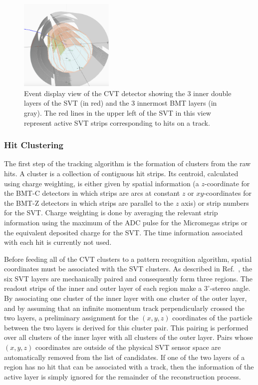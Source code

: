 \begin{figure}
\centering
\includegraphics[width=0.4\textwidth]{pics/cvt.png}
\caption{Event display view of the CVT detector showing the 3 inner double layers of the SVT (in red) and the 3
  innermost BMT layers (in gray). The red lines in the upper left of the SVT in this view represent active SVT strips
  corresponding to hits on a track.}
\label{fig:cvt}
\end{figure}

\subsubsection{Hit Clustering}

The first step of the tracking algorithm is the formation of clusters from the raw hits. A cluster is a collection of
contiguous hit strips. Its centroid, calculated using charge weighting, is either given by spatial information (a
$z$-coordinate for the BMT-C detectors in which strips are arcs at constant $z$ or $xy$-coordinates for the
BMT-Z detectors in which strips are parallel to the $z$ axis) or strip numbers for the SVT. Charge weighting is done
by averaging the relevant strip information using the maximum of the ADC pulse for the Micromegas strips or the
equivalent deposited charge for the SVT. The time information associated with each hit is currently not used.

Before feeding all of the CVT clusters to a pattern recognition algorithm, spatial coordinates must be associated with
the SVT clusters. As described in Ref.~\cite{svt-nim}, the six SVT layers are mechanically paired and consequently
form three regions. The readout strips of the inner and outer layer of each region make a $3^\circ$-stereo angle. By
associating one cluster of the inner layer with one cluster of the outer layer, and by assuming that an infinite
momentum track perpendicularly crossed the two layers, a preliminary assignment for the $(x,y,z)$ coordinates of
the particle between the two layers is derived for this cluster pair. This pairing is performed over all clusters of
the inner layer with all clusters of the outer layer. Pairs whose $(x,y,z)$ coordinates are outside of the physical SVT
sensor space are automatically removed from the list of candidates. If one of the two layers of a region has no hit that
can be associated with a track, then the information of the active layer is simply ignored for the remainder of the
reconstruction process.

